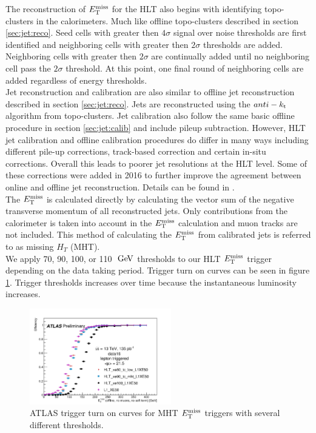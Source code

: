 \indent The reconstruction of $E_{\mathrm{T}}^{\mathrm{miss}}$ for the HLT also begins with identifying topo-clusters in the calorimeters.  Much like offline topo-clusters described in section \ref{sec:jet:reco}.  Seed cells with greater then $4\sigma$ signal over noise thresholds are first identified and neighboring cells with greater then $2\sigma$ thresholds are added.  Neighboring cells with greater then $2\sigma$ are continually added until no neighboring cell pass the $2\sigma$ threshold.  At this point, one final round of neighboring cells are added regardless of energy thresholds. \\

\indent Jet reconstruction and calibration are also similar to offline jet reconstruction described in section \ref{sec:jet:reco}.  Jets are reconstructed using the $anti-k_{\rm{t}}$ algorithm from topo-clusters.  Jet calibration also follow the same basic offline procedure in section \ref{sec:jet:calib} and include pileup subtraction. However, HLT jet calibration and offline calibration procedures do differ in many ways including different pile-up corrections, track-based correction and certain in-situ corrections.  Overall this leads to poorer jet resolutions at the HLT level.  Some of these corrections were added in 2016 to further improve the agreement between online and offline jet reconstruction.  Details can be found in \cite{Trigger2016}. \\

\indent The $E_{\mathrm{T}}^{\mathrm{miss}}$ is calculated directly by calculating the vector sum of the negative transverse momentum of all reconstructed jets.  Only contributions from the calorimeter is taken into account in the $E_{\mathrm{T}}^{\mathrm{miss}}$ calculation and muon tracks are not included.  This method of calculating the $E_{\mathrm{T}}^{\mathrm{miss}}$ from calibrated jets is referred to as missing $H_T$ (MHT).  \\

\indent We apply 70, 90, 100, or 110 $\gev$ thresholds to our HLT $E_{\mathrm{T}}^{\mathrm{miss}}$ trigger depending on the data taking period.  Trigger turn on curves can be seen in figure \ref{fig:trigTurnON}. Trigger thresholds increases over time because the instantaneous luminosity increases. \\

\begin{figure}[htb]
  \begin{center}
    \includegraphics[width=0.55\textwidth]{figures/trigger/2016-05-16-UpdatedTurnOns.png}\hspace{0.05\textwidth}
\end{center}
\caption{ATLAS trigger turn on curves for MHT $E_{\mathrm{T}}^{\mathrm{miss}}$ triggers with several different thresholds.}
\label{fig:trigTurnON} 
\end{figure}

